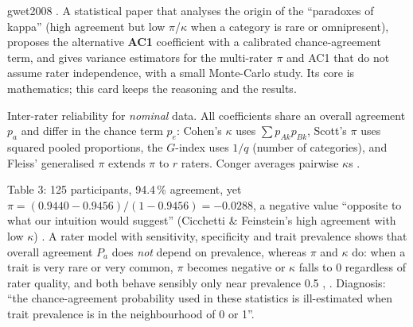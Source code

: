 \begin{papercard}{gwet2008}
 . A statistical paper that analyses the origin of the ``paradoxes of kappa'' (high agreement but low $\pi$/$\kappa$ when a category is rare or omnipresent), proposes the alternative \textbf{AC1} coefficient with a calibrated chance-agreement term, and gives variance estimators for the multi-rater $\pi$ and AC1 that do not assume rater independence, with a small Monte-Carlo study. Its core is mathematics; this card keeps the reasoning and the results.

 Inter-rater reliability for \emph{nominal} data. All coefficients share an overall agreement $p_a$ and differ in the chance term $p_{e}$: Cohen's $\kappa$ uses $\sum p_{Ak}p_{Bk}$, Scott's $\pi$ uses squared pooled proportions, the $G$-index uses $1/q$ (number of categories), and Fleiss' generalised $\pi$ extends $\pi$ to $r$ raters. Conger averages pairwise $\kappa$s .

 Table 3: 125 participants, 94.4\,\% agreement, yet $\pi=(0.9440-0.9456)/(1-0.9456)=-0.0288$, a negative value ``opposite to what our intuition would suggest'' (Cicchetti \& Feinstein's high agreement with low $\kappa$) . A rater model with sensitivity, specificity and trait prevalence shows that overall agreement $P_a$ does \emph{not} depend on prevalence, whereas $\pi$ and $\kappa$ do: when a trait is very rare or very common, $\pi$ becomes negative or $\kappa$ falls to 0 regardless of rater quality, and both behave sensibly only near prevalence 0.5 , . Diagnosis: ``the chance-agreement probability used in these statistics is ill-estimated when trait prevalence is in the neighbourhood of 0 or 1''.


\end{papercard}
